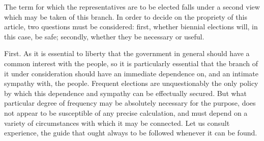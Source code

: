 The term for which the representatives are to be elected falls under a second view which may be taken of this branch. In order to decide on the propriety of this article, two questions must be considered: first, whether biennial elections will, in this case, be safe; secondly, whether they be necessary or useful.

First. As it is essential to liberty that the government in general should have a common interest with the people, so it is particularly essential that the branch of it under consideration should have an immediate dependence on, and an intimate sympathy with, the people. Frequent elections are unquestionably the only policy by which this dependence and sympathy can be effectually secured. But what particular degree of frequency may be absolutely necessary for the purpose, does not appear to be susceptible of any precise calculation, and must depend on a variety of circumstances with which it may be connected. Let us consult experience, the guide that ought always to be followed whenever it can be found.

